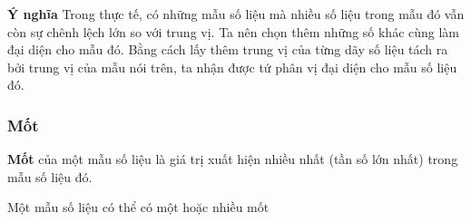\textbf{Ý nghĩa}
Trong thực tế, có những mẫu số liệu mà nhiều số liệu trong mẫu đó vẫn còn sự chênh lệch lớn so với trung vị. Ta nên chọn thêm những số khác cùng làm đại diện cho mẫu đó. Bằng cách lấy thêm trung vị của từng dãy số liệu tách ra bởi trung vị của mẫu nói trên, ta nhận được tứ phân vị đại diện cho mẫu số liệu đó.

\subsubsection{Mốt}
    \begin{boxdn}
		\textbf{Mốt} của một mẫu số liệu là giá trị xuất hiện nhiều nhất (tần số lớn nhất) trong mẫu số liệu đó.
	\end{boxdn}
\begin{note}
	Một mẫu số liệu có thể có một hoặc nhiều mốt
\end{note}

\setcounter{dang}{0}
